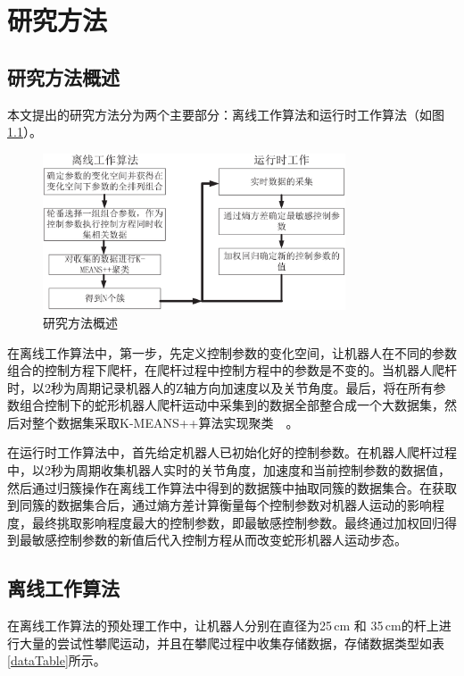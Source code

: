 \chapter{研究方法}
\label{cha:method}

\section{研究方法概述}
本文提出的研究方法分为两个主要部分：离线工作算法和运行时工作算法（如图\ref{fig:stepMap}）。
\begin{figure}[h]
	\centering
	\includegraphics[width=0.8\textwidth]{figure/chap03/step.eps}
	\caption{研究方法概述}
	\label{fig:stepMap}
\end{figure}

在离线工作算法中，第一步，先定义控制参数的变化空间，让机器人在不同的参数组合的控制方程下爬杆，在爬杆过程中控制方程中的参数是不变的。当机器人爬杆时，以2秒为周期记录机器人的Z轴方向加速度以及关节角度。最后，将在所有参数组合控制下的蛇形机器人爬杆运动中采集到的数据全部整合成一个大数据集，然后对整个数据集采取K-MEANS++算法实现聚类~\cite{Cluseter_ICT}~\cite{KmeansAndDeepLearning}。

在运行时工作算法中，首先给定机器人已初始化好的控制参数。在机器人爬杆过程中，以2秒为周期收集机器人实时的关节角度，加速度和当前控制参数的数据值，然后通过归簇操作在离线工作算法中得到的数据簇中抽取同簇的数据集合。在获取到同簇的数据集合后，通过熵方差计算衡量每个控制参数对机器人运动的影响程度，最终挑取影响程度最大的控制参数，即最敏感控制参数。最终通过加权回归得到最敏感控制参数的新值后代入控制方程从而改变蛇形机器人运动步态。

\section{离线工作算法}
在离线工作算法的预处理工作中，让机器人分别在直径为25\,cm 和 35\,cm的杆上进行大量的尝试性攀爬运动，并且在攀爬过程中收集存储数据，存储数据类型如表\,\ref{dataTable}所示。

